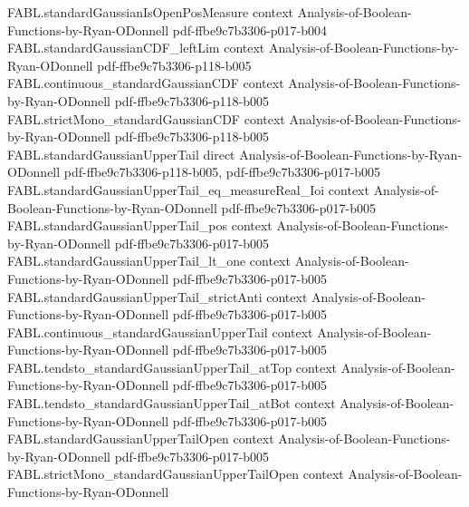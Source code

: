 \begin{theorem}
\label{FABL.log_inv_standardGaussianUpperTail_isEquivalent_sq}
\leanok
{}
\proofstep
  {FABL.standardGaussianIsOpenPosMeasure}
  {context}
  {Analysis-of-Boolean-Functions-by-Ryan-ODonnell}
  {pdf-ffbe9c7b3306-p017-b004}
\proofstep
  {FABL.standardGaussianCDF_leftLim}
  {context}
  {Analysis-of-Boolean-Functions-by-Ryan-ODonnell}
  {pdf-ffbe9c7b3306-p118-b005}
\proofstep
  {FABL.continuous_standardGaussianCDF}
  {context}
  {Analysis-of-Boolean-Functions-by-Ryan-ODonnell}
  {pdf-ffbe9c7b3306-p118-b005}
\proofstep
  {FABL.strictMono_standardGaussianCDF}
  {context}
  {Analysis-of-Boolean-Functions-by-Ryan-ODonnell}
  {pdf-ffbe9c7b3306-p118-b005}
\proofstep
  {FABL.standardGaussianUpperTail}
  {direct}
  {Analysis-of-Boolean-Functions-by-Ryan-ODonnell}
  {pdf-ffbe9c7b3306-p118-b005,
    pdf-ffbe9c7b3306-p017-b005}
\proofstep
  {FABL.standardGaussianUpperTail_eq_measureReal_Ioi}
  {context}
  {Analysis-of-Boolean-Functions-by-Ryan-ODonnell}
  {pdf-ffbe9c7b3306-p017-b005}
\proofstep
  {FABL.standardGaussianUpperTail_pos}
  {context}
  {Analysis-of-Boolean-Functions-by-Ryan-ODonnell}
  {pdf-ffbe9c7b3306-p017-b005}
\proofstep
  {FABL.standardGaussianUpperTail_lt_one}
  {context}
  {Analysis-of-Boolean-Functions-by-Ryan-ODonnell}
  {pdf-ffbe9c7b3306-p017-b005}
\proofstep
  {FABL.standardGaussianUpperTail_strictAnti}
  {context}
  {Analysis-of-Boolean-Functions-by-Ryan-ODonnell}
  {pdf-ffbe9c7b3306-p017-b005}
\proofstep
  {FABL.continuous_standardGaussianUpperTail}
  {context}
  {Analysis-of-Boolean-Functions-by-Ryan-ODonnell}
  {pdf-ffbe9c7b3306-p017-b005}
\proofstep
  {FABL.tendsto_standardGaussianUpperTail_atTop}
  {context}
  {Analysis-of-Boolean-Functions-by-Ryan-ODonnell}
  {pdf-ffbe9c7b3306-p017-b005}
\proofstep
  {FABL.tendsto_standardGaussianUpperTail_atBot}
  {context}
  {Analysis-of-Boolean-Functions-by-Ryan-ODonnell}
  {pdf-ffbe9c7b3306-p017-b005}
\proofstep
  {FABL.standardGaussianUpperTailOpen}
  {context}
  {Analysis-of-Boolean-Functions-by-Ryan-ODonnell}
  {pdf-ffbe9c7b3306-p017-b005}
\proofstep
  {FABL.strictMono_standardGaussianUpperTailOpen}
  {context}
  {Analysis-of-Boolean-Functions-by-Ryan-ODonnell}

\end{theorem}
